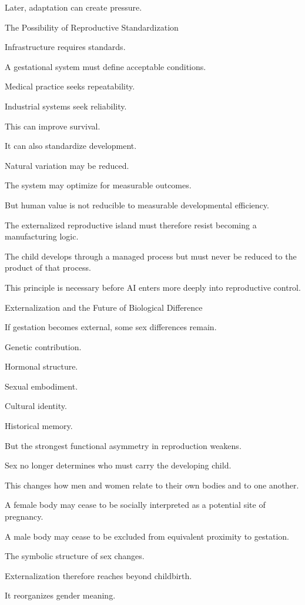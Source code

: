 Later, adaptation can create pressure.

The Possibility of Reproductive Standardization

Infrastructure requires standards.

A gestational system must define acceptable conditions.

Medical practice seeks repeatability.

Industrial systems seek reliability.

This can improve survival.

It can also standardize development.

Natural variation may be reduced.

The system may optimize for measurable outcomes.

But human value is not reducible to measurable developmental efficiency.

The externalized reproductive island must therefore resist becoming a manufacturing logic.

The child develops through a managed process but must never be reduced to the product of that process.

This principle is necessary before AI enters more deeply into reproductive control.

Externalization and the Future of Biological Difference

If gestation becomes external, some sex differences remain.

Genetic contribution.

Hormonal structure.

Sexual embodiment.

Cultural identity.

Historical memory.

But the strongest functional asymmetry in reproduction weakens.

Sex no longer determines who must carry the developing child.

This changes how men and women relate to their own bodies and to one another.

A female body may cease to be socially interpreted as a potential site of pregnancy.

A male body may cease to be excluded from equivalent proximity to gestation.

The symbolic structure of sex changes.

Externalization therefore reaches beyond childbirth.

It reorganizes gender meaning.

